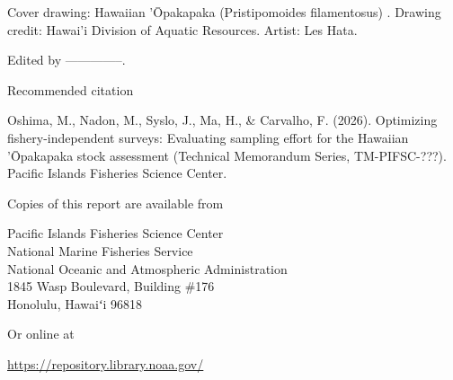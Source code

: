 {\fontsize{12pt}{14pt}\selectfont Cover drawing: Hawaiian 'Ōpakapaka \fontsize{12pt}{14pt}\selectfont(Pristipomoides filamentosus) \fontsize{12pt}{14pt}\selectfont. Drawing credit: Hawai'i Division of Aquatic Resources. Artist: Les Hata.\par}
\vspace{0.25cm}

{\fontsize{12pt}{14pt}\selectfont Edited by --------------.\par}
\vspace{0.5cm}


{\fontsize{14pt}{16pt}\selectfont Recommended citation\par}
\vspace{0.25cm}

{\fontsize{12pt}{14pt}\selectfont Oshima, M., Nadon, M., Syslo, J., Ma, H., \& Carvalho, F. (2026). Optimizing fishery-independent surveys: Evaluating sampling effort for the Hawaiian 'Ōpakapaka stock assessment (Technical Memorandum Series, TM-PIFSC-???). Pacific Islands Fisheries Science Center.\par}
\vspace{0.5cm}

{\fontsize{14pt}{16pt}\selectfont Copies of this report are available from\par}
\vspace{0.25cm}

{\fontsize{12pt}{14pt}\selectfont
Pacific Islands Fisheries Science Center\\
National Marine Fisheries Service\\
National Oceanic and Atmospheric Administration\\
1845 Wasp Boulevard, Building \#176\\
Honolulu, Hawaiʻi 96818\par}
\vspace{0.5cm}



{\fontsize{14pt}{16pt}\selectfont Or online at\par}
\vspace{0.25cm}

{\fontsize{12pt}{14pt}\selectfont \href{https://repository.library.noaa.gov/}{\color{blue}\underline{https://repository.library.noaa.gov/}}\par}


\clearpage
{}   %
